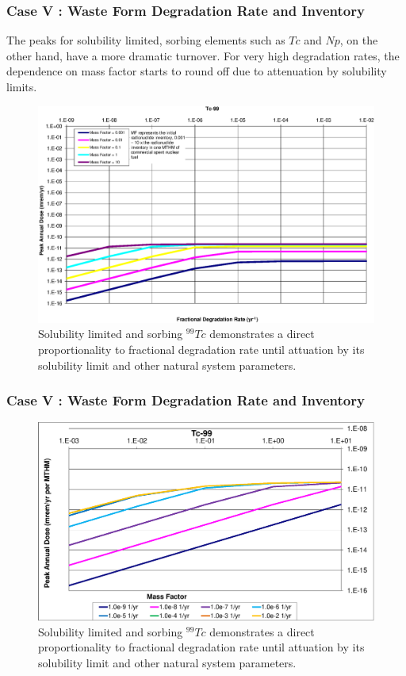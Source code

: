 \begin{frame}[c]
  \frametitle{Case V : Waste Form Degradation Rate and Inventory}
The peaks for solubility limited, sorbing elements such as $Tc$ and $Np$, on the 
other hand, have a more dramatic turnover.  For very high degradation rates, the 
dependence on mass factor starts to round off due to attenuation by solubility 
limits.


\begin{figure}[ht!]
\centering
\includegraphics[width=\linewidth]{WFDegAndInv/Tc-99.eps}
\caption{
Solubility limited and sorbing $^{99}Tc$ demonstrates a direct proportionality 
to fractional degradation rate until attuation by its solubility limit and other 
natural system parameters. } 
\label{fig:WFDegTc99}
\end{figure}
\end{frame}

\begin{frame}[c]
  \frametitle{Case V : Waste Form Degradation Rate and Inventory}

\begin{figure}[ht!]
\centering
\includegraphics[width=\linewidth]{WFDegAndInv/Tc-99-MF.eps}
\caption{
  Solubility limited and sorbing $^{99}Tc$ demonstrates a direct proportionality 
to fractional degradation rate until attuation by its solubility limit and other 
natural system parameters. } 
\label{fig:WFDegTc99MF}
\end{figure}

\end{frame}

